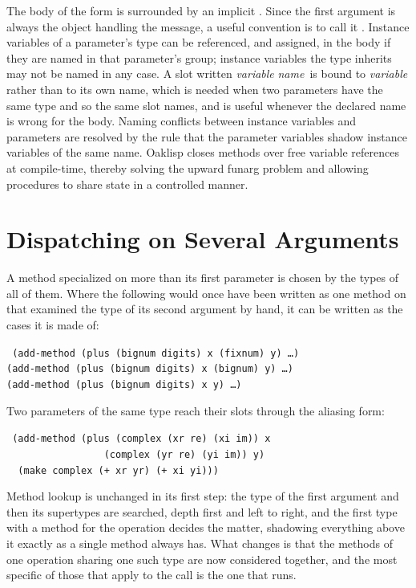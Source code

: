 The body of the form is surrounded by an implicit .  Since
the first argument is always the object handling the message, a useful
convention is to call it .  Instance variables of a
parameter's type can be referenced, and assigned, in the body if they
are named in that parameter's group; instance variables the type
inherits may not be named in any case.  A slot written
\lpar\emph{variable} \emph{name}\rpar\ is bound to \emph{variable}
rather than to its own name, which is needed when two parameters have
the same type and so the same slot names, and is useful whenever the
declared name is wrong for the body.  Naming conflicts between
instance variables and parameters are resolved by the rule that the
parameter variables shadow instance variables of the same name.
Oaklisp closes methods over free variable references at compile-time,
thereby solving the upward funarg problem and allowing procedures to
share state in a controlled manner.

\section{Dispatching on Several Arguments}

A method specialized on more than its first parameter is chosen by the
types of all of them.  Where the following would once have been
written as one method on  that examined the type of its
second argument by hand, it can be written as the cases it is made of:
\begin{flushleft}\tt
(add-method (plus (bignum digits) x (fixnum) y) \ldots)\\
(add-method (plus (bignum digits) x (bignum) y) \ldots)\\
(add-method (plus (bignum digits) x y) \ldots)
\end{flushleft}
Two parameters of the same type reach their slots through the
aliasing form:
\begin{flushleft}\tt
(add-method (plus (complex (xr re) (xi im)) x\\
~~~~~~~~~~~~~~~~~(complex (yr re) (yi im)) y)\\
~~(make complex (+ xr yr) (+ xi yi)))
\end{flushleft}

Method lookup is unchanged in its first step: the type of the first
argument and then its supertypes are searched, depth first and left to
right, and the first type with a method for the operation decides the
matter, shadowing everything above it exactly as a single method
always has.  What changes is that the methods of one operation sharing
one such type are now considered together, and the most specific of
those that apply to the call is the one that runs.

